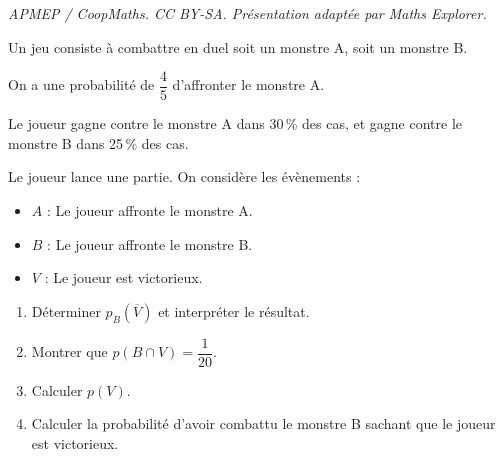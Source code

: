 \documentclass[10pt]{article}
\begin{document}
\noindent\textit{APMEP / CoopMaths. CC BY-SA. Présentation adaptée par Maths Explorer.}\par\medskip
\medskip

Un jeu consiste à combattre en duel soit un monstre A, soit un monstre B.

On a une probabilité de $\dfrac{4}{5}$ d’affronter le monstre A.

Le joueur gagne contre le monstre A dans 30\,\% des cas, et gagne contre le monstre
B dans 25\,\% des cas.

Le joueur lance une partie. On considère les évènements :

\begin{itemize}
\item $A$ : \og Le joueur affronte le monstre A. \fg
\item $B$ : \og Le joueur affronte le monstre B. \fg
\item $V$ : \og Le joueur est victorieux. \fg
\end{itemize}

\medskip

\begin{enumerate}
\item Déterminer $p_B\left(\overline{V}\right)$ et interpréter le résultat.
\item Montrer que $p(B \cap V) = \dfrac{1}{20}$.
\item Calculer $p(V)$.
\item Calculer la probabilité d’avoir combattu le monstre B sachant que le joueur est victorieux.
\end{enumerate}
\end{document}

